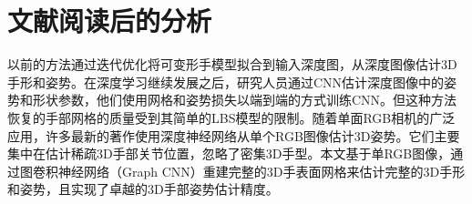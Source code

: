 \documentclass[a4paper,12pt,onecolumn,songti]{article}
\begin{document}
	\section{文献阅读后的分析}
		以前的方法通过迭代优化将可变形手模型拟合到输入深度图，从深度图像估计3D手形和姿势。在深度学习继续发展之后，研究人员通过CNN估计深度图像中的姿势和形状参数，他们使用网格和姿势损失以端到端的方式训练CNN。但这种方法恢复的手部网格的质量受到其简单的LBS模型的限制。随着单面RGB相机的广泛应用，许多最新的著作使用深度神经网络从单个RGB图像估计3D姿势。它们主要集中在估计稀疏3D手部关节位置，忽略了密集3D手型。本文基于单RGB图像，通过图卷积神经网络（Graph CNN）重建完整的3D手表面网格来估计完整的3D手形和姿势，且实现了卓越的3D手部姿势估计精度。
\end{document}
